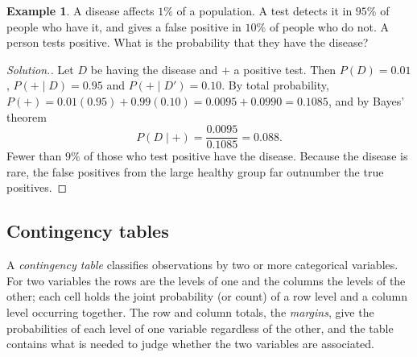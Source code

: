 \documentclass[12pt,a4paper]{report}
\theoremstyle{definition}
\newtheorem{example}[thm]{Example}
\theoremstyle{plain}
\theoremstyle{definition}
\newenvironment{solution}
  {\renewcommand{\qedsymbol}{}\begin{proof}[\textit{Solution}.]}
  {\end{proof}}
\begin{document}
\begin{figure}[H]
\centering
{}
\label{fig:batterytree}
\end{figure}

\begin{example}
\label{ex:screening}
A disease affects $1\%$ of a population. A test detects it in $95\%$ of people who have
it, and gives a false positive in $10\%$ of people who do not. A person tests
positive. What is the probability that they have the disease?
\end{example}

\begin{solution}
Let $D$ be having the disease and $+$ a positive test. Then $P(D) = 0.01$,
$P(+\mid D) = 0.95$ and $P(+\mid D') = 0.10$. By total probability,
$P(+) = 0.01(0.95) + 0.99(0.10) = 0.0095 + 0.0990 = 0.1085$, and by Bayes' theorem
\[P(D\mid +) = \frac{0.0095}{0.1085} = 0.088 .\]
Fewer than $9\%$ of those who test positive have the disease. Because the disease is
rare, the false positives from the large healthy group far outnumber the true
positives.
\end{solution}

\subsection{Contingency tables}

A \emph{contingency table} classifies observations by two or more categorical
variables. For two variables the rows are the levels of one and the columns the levels
of the other; each cell holds the joint probability (or count) of a row level and a
column level occurring together. The row and column totals, the \emph{margins}, give
the probabilities of each level of one variable regardless of the other, and the table
contains what is needed to judge whether the two variables are associated.
\end{document}
